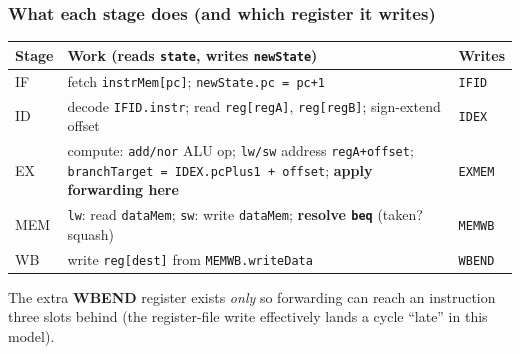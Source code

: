 \documentclass[10pt]{article}
\newcommand{\code}[1]{\texttt{\small #1}}
\begin{document}
\subsubsection{What each stage does (and which register it writes)}
\begin{center}
\renewcommand{\arraystretch}{1.18}
\begin{tabular}{@{}l p{} l@{}}
\toprule
\textbf{Stage} & \textbf{Work (reads \code{state}, writes \code{newState})} & \textbf{Writes}\\
\midrule
IF  & fetch \code{instrMem[pc]}; \code{newState.pc = pc+1}                          & \code{IFID}\\
ID  & decode \code{IFID.instr}; read \code{reg[regA]}, \code{reg[regB]}; sign-extend offset & \code{IDEX}\\
EX  & compute: \code{add/nor} ALU op; \code{lw/sw} address \code{regA+offset}; \code{branchTarget = IDEX.pcPlus1 + offset}; \textbf{apply forwarding here} & \code{EXMEM}\\
MEM & \code{lw}: read \code{dataMem}; \code{sw}: write \code{dataMem}; \textbf{resolve \code{beq}} (taken? squash) & \code{MEMWB}\\
WB  & write \code{reg[dest]} from \code{MEMWB.writeData}                            & \code{WBEND}\\
\bottomrule
\end{tabular}
\end{center}
The extra \textbf{WBEND} register exists \emph{only} so forwarding can reach an instruction three
slots behind (the register-file write effectively lands a cycle ``late'' in this model).
\end{document}
